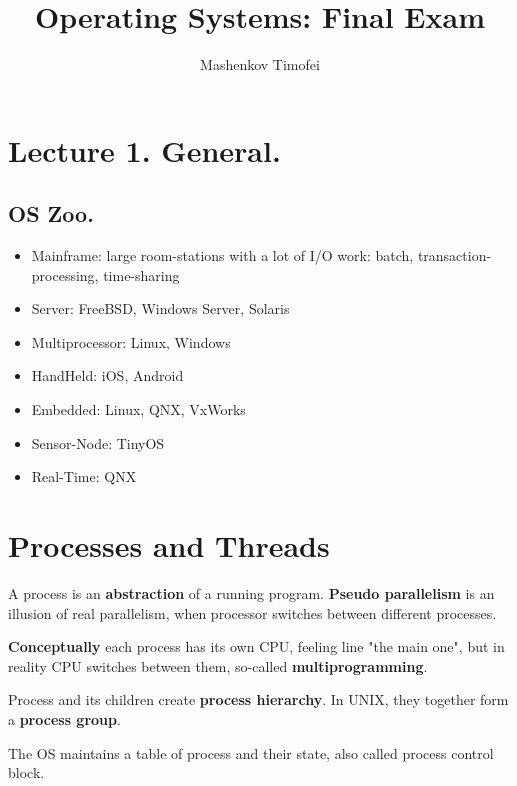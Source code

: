 \documentclass{article}
\title{Operating Systems: Final Exam}
\author{Mashenkov Timofei}
\begin{document}
\maketitle{}

\section*{Lecture 1. General.}
\noindent

\subsection*{OS Zoo.}
\noindent

\begin{itemize}
  \item Mainframe: large room-stations with a lot of I/O work: batch, transaction-processing, time-sharing
  \item Server: FreeBSD, Windows Server, Solaris
  \item Multiprocessor: Linux, Windows
  \item HandHeld: iOS, Android
  \item Embedded: Linux, QNX, VxWorks
  \item Sensor-Node: TinyOS 
  \item Real-Time: QNX
\end{itemize}

\section*{Processes and Threads}
\noindent

A process is an \textbf{abstraction} of a running program.
\textbf{Pseudo parallelism} is an illusion of real parallelism, when processor switches between different processes.

\textbf{Conceptually} each process has its own CPU, feeling line "the main one", but in reality CPU switches between
them, so-called \textbf{multiprogramming}.
\newline


Process and its children create \textbf{process hierarchy}. In UNIX, they together form a \textbf{process group}.

The OS maintains a table of process and their state, also called process control block.
\end{document}
